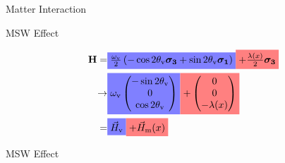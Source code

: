 \documentclass[9pt]{beamer}
\begin{document}
\begin{darkframes}
\begin{frame}{Matter Interaction}
\end{frame}





\begin{frame}{MSW Effect}

\begin{align*}
    \mathbf H =& \colorbox{blue!50}{$ \frac{\omega_{\mathrm{v}}}{2}\left( - \cos 2\theta_{\mathrm{v}} \boldsymbol{\sigma_3} + \sin 2\theta_{\mathrm{v}} \boldsymbol{\sigma_1} \right) $}   \colorbox{red!50}{$ + \frac{\lambda(x)}{2} \boldsymbol{\sigma_3} $} \\
    \to &  \colorbox{blue!50}{$ \omega_{\mathrm v}\begin{pmatrix}
    - \sin 2\theta_{\mathrm v} \\
    0 \\
    \cos 2\theta_{\mathrm v}
\end{pmatrix} $}  \colorbox{red!50}{$ + \begin{pmatrix}
    0\\
    0\\
    - \lambda(x)
    \end{pmatrix} $} \\
    = &  \colorbox{blue!50}{$ \vec H_{\mathrm v} $}  \colorbox{red!50}{$ + \vec H_{\mathrm m}(x) $}
\end{align*}






\end{frame}




\begin{frame}{MSW Effect}

\end{frame}
\end{darkframes}
\end{document}
